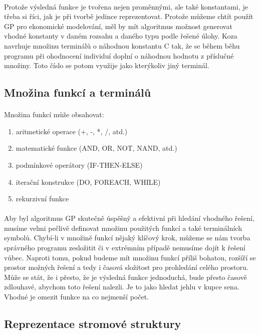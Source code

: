 \documentclass[bc,male,java,dept460]{diploma}		%
\begin{document}
\paragraph*{}
Protože výsledná funkce je tvořena nejen proměnnými, ale také konstantami, je třeba si říci, jak je při tvorbě jedince reprezentovat. Protože můžeme chtít použít GP pro ekonomické modelování, měl by mít algoritmus možnost generovat vhodné konstanty v daném rozsahu a daného typu podle řešené úlohy. Koza navrhuje množinu terminálů o náhodnou konstantu C tak, že se během běhu programu při ohodnocení individuí doplní o náhodnou hodnotu z příslučné množiny. Toto číslo se potom využije jako kterýkoliv jiný terminál.

\subsection{Množina funkcí a terminálů}
\paragraph*{}
Množina funkcí může obsahovat:
\begin{enumerate}
\item aritmetické operace (+, -, *, /, atd.)
\item matematické funkce (AND, OR, NOT, NAND, atd.)
\item podmínkové operátory (IF-THEN-ELSE)
\item iterační konstrukce (DO, FOREACH, WHILE)
\item rekurzivní funkce
\end{enumerate}

\paragraph*{}
Aby byl algoritmus GP skutečně úspěšný a efektivní při hledání vhodného řešení, musíme velmi pečlivě definovat množinu použitých funkcí a také terminálních symbolů. Chybí-li v množině funkcí nějaký klíčový krok, můžeme se nám tvorba správného programu zesložitit či v extrémním případě nemusíme dojít k řešení vůbec. Naproti tomu, pokud budeme mít množinu funkcí příliš bohatou, rozšíří se prostor možných řešení a tedy i časová složitost pro prohledání celého prostoru. Může se stát, že i přesto, že je výsledná funkce jednoduchá, bude přesto časově zdlouhavé, abychom toto řešení nalezli. Je to jako hledat jehlu v kupce sena. Vhodné je omezit funkce na co nejmenší počet.

\subsection{Reprezentace stromové struktury}
\end{document}

